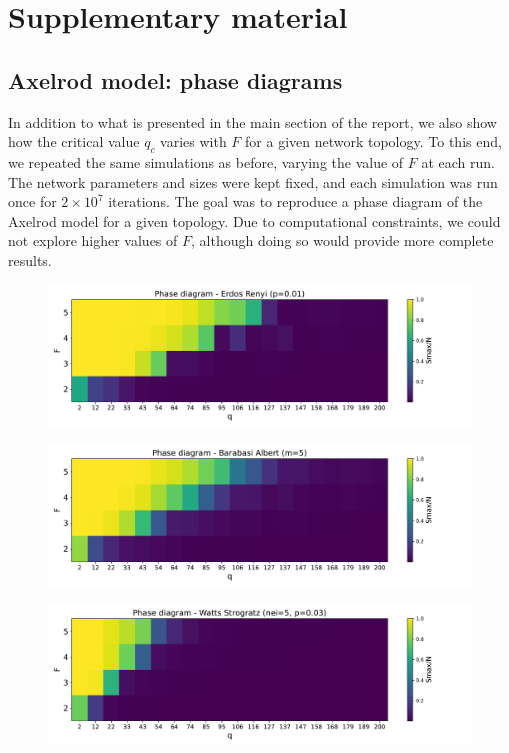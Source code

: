\usepackage{hyperref}

\appendix
\chapter{Supplementary material}
\section{Axelrod model: phase diagrams}
In addition to what is presented in the main section of the report, we also show how the critical value $q_c$ varies with $F$ for a given network topology. To this end, we repeated the same simulations as before, varying the value of $F$ at each run. The network parameters and sizes were kept fixed, and each simulation was run once for $2 \times 10^7$ iterations. The goal was to reproduce a phase diagram of the Axelrod model for a given topology. Due to computational constraints, we could not explore higher values of $F$, although doing so would provide more complete results.

\begin{figure}[hbtp]
    \centering
    \includegraphics[width=0.75\linewidth]{figures/task30_plots/phase_diagram_ER.pdf}
    \end{figure}

\begin{figure}[hbtp]
    \centering
    \includegraphics[width=0.75\linewidth]{figures/task30_plots/phase_diagram_BA.pdf}
\end{figure}

\begin{figure}[hbtp]
    \centering
    \includegraphics[width=0.75\linewidth]{figures/task30_plots/phase_diagram_WS.pdf}
\end{figure}

